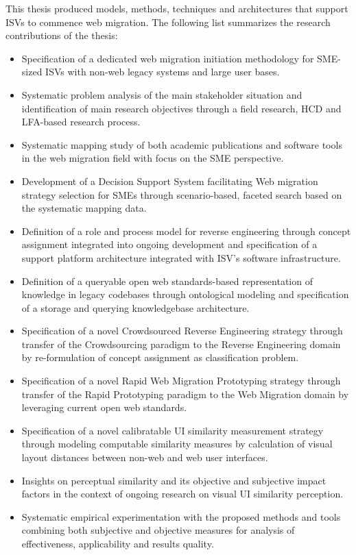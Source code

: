 This thesis produced models, methods, techniques and architectures that support ISVs to commence web migration.
The following list summarizes the research contributions of the thesis:

\begin{itemize}
\tightlist
\item
  Specification of a dedicated web migration initiation methodology for SME-sized ISVs with non-web legacy systems and large user bases.
\item
  Systematic problem analysis of the main stakeholder situation and identification of main research objectives through a field research, HCD and LFA-based research process.
\item
  Systematic mapping study of both academic publications and software tools in the web migration field with focus on the SME perspective.
\item
  Development of a Decision Support System facilitating Web migration strategy selection for SMEs through scenario-based, faceted search based on the systematic mapping data.
\item
  Definition of a role and process model for reverse engineering through concept assignment integrated into ongoing development and specification of a support platform architecture integrated with ISV's software infrastructure.
\item
  Definition of a queryable open web standards-based representation of knowledge in legacy codebases through ontological modeling and specification of a storage and querying knowledgebase architecture.
\item
  Specification of a novel Crowdsourced Reverse Engineering strategy through transfer of the Crowdsourcing paradigm to the Reverse Engineering domain by re-formulation of concept assignment as classification problem.
\item
  Specification of a novel Rapid Web Migration Prototyping strategy through transfer of the Rapid Prototyping paradigm to the Web Migration domain by leveraging current open web standards.
\item
  Specification of a novel calibratable UI similarity measurement strategy through modeling computable similarity measures by calculation of visual layout distances between non-web and web user interfaces.
\item
  Insights on perceptual similarity and its objective and subjective impact factors in the context of ongoing research on visual UI similarity perception.
\item
  Systematic empirical experimentation with the proposed methods and tools combining both subjective and objective measures for analysis of effectiveness, applicability and results quality.
\end{itemize}

